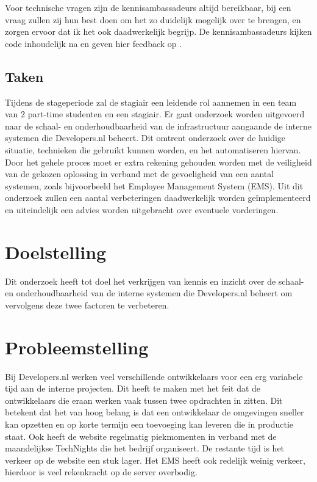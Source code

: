 Voor technische vragen zijn de kennisambassadeurs altijd bereikbaar, bij een vraag zullen zij hun best doen om het zo duidelijk mogelijk over te brengen, en zorgen ervoor dat ik het ook daadwerkelijk begrijp. De kennisambassadeurs kijken code inhoudelijk na en geven hier feedback op \parencite{Stageplan}.

\subsection{Taken}
Tijdens de stageperiode zal de stagiair een leidende rol aannemen in een team van 2 part-time studenten en een stagiair. Er gaat onderzoek worden uitgevoerd naar de schaal- en onderhoudbaarheid van de infrastructuur aangaande de interne systemen die Developers.nl beheert. Dit omtrent onderzoek over de huidige situatie, technieken die gebruikt kunnen worden, en het automatiseren hiervan. Door het gehele proces moet er extra rekening gehouden worden met de veiligheid van de gekozen oplossing in verband met de gevoeligheid van een aantal systemen, zoals bijvoorbeeld het Employee Management System (EMS). Uit dit onderzoek zullen een aantal verbeteringen daadwerkelijk worden geïmplementeerd en uiteindelijk een advies worden uitgebracht over eventuele vorderingen.

\section{Doelstelling}

Dit onderzoek heeft tot doel het verkrijgen van kennis en inzicht over de schaal- en onderhoudbaarheid van de interne systemen die Developers.nl beheert om vervolgens deze twee factoren te verbeteren.


\section{Probleemstelling}
Bij Developers.nl werken veel verschillende ontwikkelaars voor een erg variabele tijd aan de interne projecten. Dit heeft te maken met het feit dat de ontwikkelaars die eraan werken vaak tussen twee opdrachten in zitten. Dit betekent dat het van hoog belang is dat een ontwikkelaar de omgevingen sneller kan opzetten en op korte termijn een toevoeging kan leveren die in productie staat. Ook heeft de website regelmatig piekmomenten in verband met de maandelijkse TechNights die het bedrijf organiseert. De restante tijd is het verkeer op de website een stuk lager. Het EMS heeft ook redelijk weinig verkeer, hierdoor is veel rekenkracht op de server overbodig.

